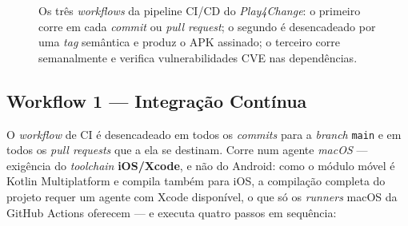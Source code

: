 \begin{figure}[htbp]
{
	}%
	\caption[Pipeline CI/CD do Play4Change com os três workflows GitHub Actions]{Os três \emph{workflows} da pipeline CI/CD do \emph{Play4Change}: o primeiro corre em cada \emph{commit} ou \emph{pull request}; o segundo é desencadeado por uma \emph{tag} semântica e produz o APK assinado; o terceiro corre semanalmente e verifica vulnerabilidades CVE nas dependências.}
	\label{fig:cicd-pipeline}
\end{figure}

\subsection*{Workflow 1 --- Integração Contínua}

O \emph{workflow} de CI é desencadeado em todos os \emph{commits} para a \emph{branch} \texttt{main} e em todos os \emph{pull requests} que a ela se destinam. Corre num agente \emph{macOS} --- exigência do \emph{toolchain} \textbf{iOS/Xcode}, e não do Android: como o módulo móvel é Kotlin Multiplatform e compila também para iOS, a compilação completa do projeto requer um agente com Xcode disponível, o que só os \emph{runners} macOS da GitHub Actions oferecem --- e executa quatro passos em sequência:

